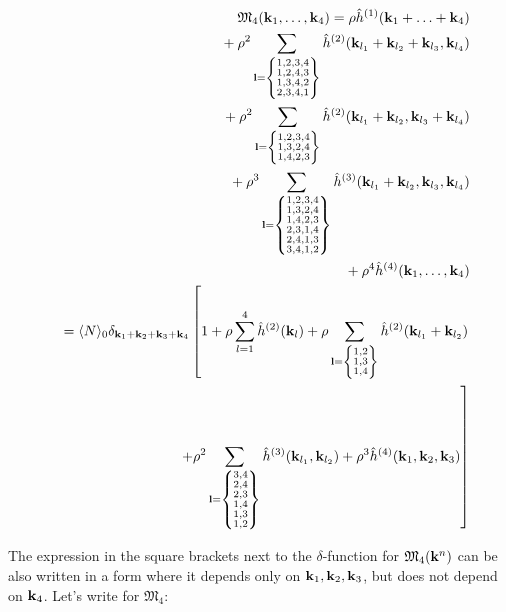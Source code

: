 \begin{eqnarray}
	\label{CumulantM4}
	&&\mathfrak M_4 (\vb k_1, \dotsc, \vb k_4) = \rho \hat{h}^{(1)}(\vb k_1 + \dotsc + \vb k_4) 
	\nonumber\\
	&&\quad{} + \rho^2 \sum_{\vb l = \left\{ \substack{1,2,3,4 \\ 1,2,4,3 \\ 1,3,4,2 \\ 2,3,4,1} \right\}}
	\hat{h}^{(2)}(\vb k_{l_1} + \vb k_{l_2} + \vb k_{l_3}, \vb k_{l_4})
	\nonumber\\
	&&\quad{} + \rho^2
	\sum_{\vb l = \left\{ \substack{1,2,3,4 \\ 1,3,2,4 \\ 1,4,2,3} \right\}}
	\hat{h}^{(2)}(\vb k_{l_1} + \vb k_{l_2}, \vb k_{l_3} + \vb k_{l_4})
	\nonumber\\
	&&\quad{} + \rho^3
	\sum_{\vb l = \left\{\substack{1,2,3,4 \\ 1,3,2,4 \\ 1,4,2,3 \\ 2,3,1,4 \\ 2,4,1,3 \\ 3,4,1,2} \right\} }
	\hat{h}^{(3)}(\vb k_{l_1} + \vb k_{l_2}, \vb k_{l_3}, \vb k_{l_4})
	\nonumber\\
	&&\quad{} +\rho^4 \hat{h}^{(4)}(\vb k_1, \dotsc, \vb k_4)
	\nonumber \\
	&&= \langle N \rangle_0 \delta_{\vb k_1 + \vb k_2 + \vb k_3 + \vb k_4} 
	\left[ 1 + \rho\sum_{l = 1}^4 \hat{h}^{(2)}(\vb k_l) + 
	\rho 
	\sum_{\vb l = \left\{\substack{1,2 \\ 1,3 \\ 1,4}\right\}}
	\hat{h}^{(2)} (\vb k_{l_1} + \vb k_{l_2})
	\right. \nonumber \\
	&&\quad{} \left. + \rho^2
	\sum_{\vb l = \left\{\substack{3,4 \\ 2,4 \\ 2,3 \\ 1,4 \\ 1,3 \\ 1,2}\right\} }
	\hat{h}^{(3)}(\vb k_{l_1}, \vb k_{l_2})
	+ \rho^3 \hat{h}^{(4)} (\vb k_1, \vb k_2, \vb k_3)
	\right] 
\end{eqnarray}

The expression in the square brackets next to the $\delta$-function for $\mathfrak M_4(\vb k^n)$ can be also written in a form where it depends only on $\vb k_1, \vb k_2, \vb k_3$, but does not depend on $\vb k_4$.
Let's write for $\mathfrak M_4$:

